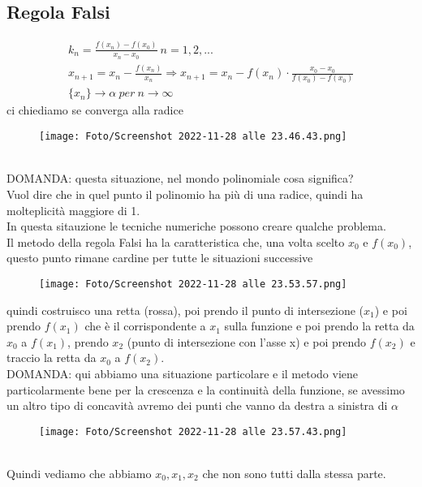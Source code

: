 \documentclass[a4paper, portrait]{book}
\numberwithin{equation}{chapter} %
\begin{document}
\subsection*{Regola Falsi}
\begin{gather}
    k_n = \frac{f(x_n) - f(x_0)}{x_n - x_0} \ n = 1,2,...\\
    x_{n+1} = x_n - \frac{f(x_n)}{x_n} \Rightarrow x_{n+1} = x_n - f(x_n) \cdot \frac{x_0 - x_0}{f(x_0) - f(x_0)}\\
    \{x_n\} \rightarrow \alpha \ per \ n \rightarrow \infty
\end{gather}
ci chiediamo se converga alla radice
\begin{figure}[h!]
    \centering
    \texttt{[image: Foto/Screenshot 2022-11-28 alle 23.46.43.png]}
    \caption{}
\end{figure}
\\DOMANDA: questa situazione, nel mondo polinomiale cosa significa?\\
Vuol dire che in quel punto il polinomio ha più di una radice, quindi ha molteplicità maggiore di 1.\\
In questa sitauzione le tecniche numeriche possono creare qualche problema.\\
Il metodo della regola Falsi ha la caratteristica che, una volta scelto $x_0$ e $f(x_0)$, questo punto rimane cardine per tutte le situazioni successive
\begin{figure}[h!]
    \centering
    \texttt{[image: Foto/Screenshot 2022-11-28 alle 23.53.57.png]}
    \caption{}
\end{figure}
quindi costruisco una retta (rossa), poi prendo il punto di intersezione ($x_1$) e poi prendo $f(x_1)$ che è il corrispondente a $x_1$ sulla funzione e poi prendo la retta da $x_0$ a $f(x_1)$, prendo $x_2$ (punto di intersezione con l'asse x) e poi prendo $f(x_2)$ e traccio la retta da $x_0$ a $f(x_2)$.\\
DOMANDA: qui abbiamo una situazione particolare e il metodo viene particolarmente bene per la crescenza e la continuità della funzione, se avessimo un altro tipo di concavità avremo dei punti che vanno da destra a sinistra di $\alpha$
\begin{figure}[h!]
    \centering
    \texttt{[image: Foto/Screenshot 2022-11-28 alle 23.57.43.png]}
    \caption{}
\end{figure}
\\Quindi vediamo che abbiamo $x_0, x_1, x_2$ che non sono tutti dalla stessa parte.\\
\end{document}
